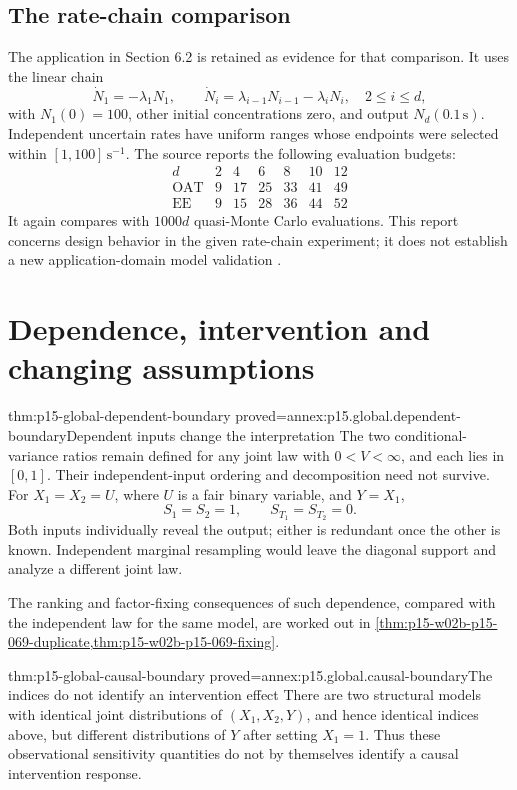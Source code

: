 \subsection{The rate-chain comparison}
\label{sec:p15-global-rate-chain}

The application in Section 6.2 is retained as evidence for that
comparison. It uses the linear chain
\[
 \dot N_1=-\lambda_1N_1,\qquad
 \dot N_i=\lambda_{i-1}N_{i-1}-\lambda_iN_i,\quad 2\leq i\leq d,
\]
with \(N_1(0)=100\), other initial concentrations zero, and output
\(N_d(0.1\,\mathrm{s})\). Independent uncertain rates have uniform
ranges whose endpoints were selected within
\([1,100]\,\mathrm{s}^{-1}\).
The source reports the following evaluation budgets:
\[
 \begin{array}{c|rrrrrr}
 d&2&4&6&8&10&12\\ \hline
 \mathrm{OAT}&9&17&25&33&41&49\\
 \mathrm{EE}&9&15&28&36&44&52
 \end{array}
\]
It again compares with \(1000d\) quasi-Monte Carlo evaluations.
This report concerns design behavior in the given rate-chain experiment;
it does not establish a new application-domain model validation
\cite[Section 6]{SaltelliAnnoni2010Sensitivity}.

\section{Dependence, intervention and changing assumptions}

\begin{hbtheorem}{thm:p15-global-dependent-boundary}
 {proved=annex:p15.global.dependent-boundary}{Dependent inputs change the interpretation}
The two conditional-variance ratios remain defined for any joint law
with \(0<V<\infty\), and each lies in \([0,1]\).
Their independent-input ordering and decomposition need not survive.
For \(X_1=X_2=U\), where \(U\) is a fair binary variable, and \(Y=X_1\),
\[
 S_1=S_2=1,\qquad S_{T_1}=S_{T_2}=0.
\]
Both inputs individually reveal the output; either is redundant once
the other is known. Independent marginal resampling would leave the
diagonal support and analyze a different joint law.
\end{hbtheorem}

The ranking and factor-fixing consequences of such dependence, compared
with the independent law for the same model, are worked out in
\cref{thm:p15-w02b-p15-069-duplicate,thm:p15-w02b-p15-069-fixing}.

\begin{hbtheorem}{thm:p15-global-causal-boundary}
 {proved=annex:p15.global.causal-boundary}{The indices do not identify an intervention effect}
There are two structural models with identical joint distributions of
\((X_1,X_2,Y)\), and hence identical indices above, but different
distributions of \(Y\) after setting \(X_1=1\).
Thus these observational sensitivity quantities do not by themselves
identify a causal intervention response.
\end{hbtheorem}


